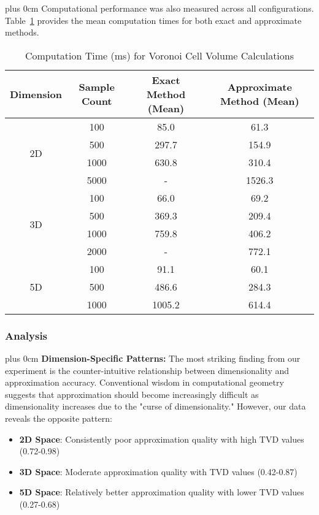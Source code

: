 \documentclass[conference]{IEEEtran}
\newcommand{\justifytext}{\leftskip=0pt \rightskip=0pt plus 0cm}
\begin{document}
\justifytext
Computational performance was also measured across all configurations. Table~\ref{table:voronoi-performance} provides the mean computation times for both exact and approximate methods.

\begin{table}[h]
\centering
\caption{Computation Time (ms) for Voronoi Cell Volume Calculations}
\label{table:voronoi-performance}
\begin{tabular}{|c|c|c|c|}
\hline
\textbf{Dimension} & \textbf{Sample Count} & \textbf{Exact Method (Mean)} & \textbf{Approximate Method (Mean)} \\
\hline
\multirow{4}{*}{2D} & 100 & 85.0 & 61.3 \\
 & 500 & 297.7 & 154.9 \\
 & 1000 & 630.8 & 310.4 \\
 & 5000 & - & 1526.3 \\
\hline
\multirow{4}{*}{3D} & 100 & 66.0 & 69.2 \\
 & 500 & 369.3 & 209.4 \\
 & 1000 & 759.8 & 406.2 \\
 & 2000 & - & 772.1 \\
\hline
\multirow{3}{*}{5D} & 100 & 91.1 & 60.1 \\
 & 500 & 486.6 & 284.3 \\
 & 1000 & 1005.2 & 614.4 \\
\hline
\end{tabular}
\end{table}

\subsubsection{Analysis}

\justifytext
\textbf{Dimension-Specific Patterns:} The most striking finding from our experiment is the counter-intuitive relationship between dimensionality and approximation accuracy. Conventional wisdom in computational geometry suggests that approximation should become increasingly difficult as dimensionality increases due to the "curse of dimensionality." However, our data reveals the opposite pattern:

\begin{itemize}
    \item \textbf{2D Space}: Consistently poor approximation quality with high TVD values (0.72-0.98)
    \item \textbf{3D Space}: Moderate approximation quality with TVD values (0.42-0.87)
    \item \textbf{5D Space}: Relatively better approximation quality with lower TVD values (0.27-0.68)
\end{itemize}
\end{document}
